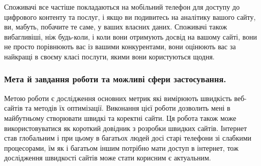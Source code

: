 Споживачі все частіше покладаються на мобільний телефон для доступу до цифрового контенту та послуг,
і якщо ви подивитесь на аналітику вашого сайту, ви, мабуть, побачите те саме, у ваших власних даних.
Споживачі також вибагливіші, ніж будь-коли, і коли вони отримують досвід на вашому сайті,
вони не просто порівнюють вас із вашими конкурентами, вони оцінюють вас за найкращі в своєму класі послуги,
якими вони користуються щодня.
\subsubsection*{Мета й завдання роботи та можливі сфери застосування.}
Метою роботи є дослідження основних метрик які вимірюють швидкість веб-сайтів та методів їх оптимізації.
Виконання цієї роботи дозволить мені в майбутньому створювати швидкі та коректні сайти.
Ця робота також може використовуватися як короткий довідник з розробки швидких сайтів.
Інтернет став глобальним і при цьому в багатьох людей досі старі телефони зі слабкими процесорами,
їм як і багатьом іншим потрібно мати доступ в інтернет, тож дослідження швидкості сайтів може стати корисним є актуальним.
